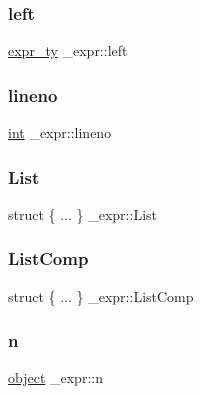 \mbox{\label{struct__expr_a57fda7bca80c71b8720b6e4ed6586bc0}} 
\subsubsection{\texorpdfstring{left}{left}}
{\footnotesize\ttfamily \mbox{\hyperlink{_python-ast_8h_a56d3705e020a071405094a220c4592bd}{expr\+\_\+ty}} \+\_\+expr\+::left}

\mbox{\label{struct__expr_a998fb97c3e3b6e418e07ba5a0e9673eb}} 
\subsubsection{\texorpdfstring{lineno}{lineno}}
{\footnotesize\ttfamily \mbox{\hyperlink{warnings_8h_a74f207b5aa4ba51c3a2ad59b219a423b}{int}} \+\_\+expr\+::lineno}

\mbox{\label{struct__expr_a592a05c7ef90556f4fa9350907551748}} 
\subsubsection{\texorpdfstring{List}{List}}
{\footnotesize\ttfamily struct \{ ... \}   \+\_\+expr\+::\+List}

\mbox{\label{struct__expr_a03b35a9487bef377a261a3bfdfc18469}} 
\subsubsection{\texorpdfstring{ListComp}{ListComp}}
{\footnotesize\ttfamily struct \{ ... \}   \+\_\+expr\+::\+List\+Comp}

\mbox{\label{struct__expr_a85bad2d1da1dd27ce9214d23983dc8c8}} 
\subsubsection{\texorpdfstring{n}{n}}
{\footnotesize\ttfamily \mbox{\hyperlink{classobject}{object}} \+\_\+expr\+::n}

